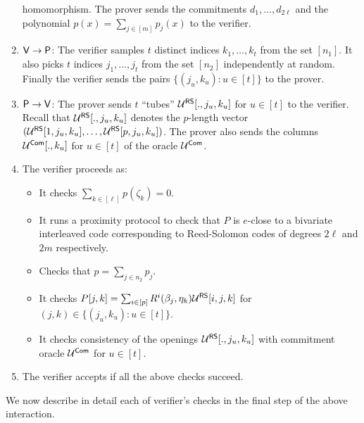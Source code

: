 \begin{enumerate}[{\rm 1.}]
homomorphism.
The prover sends the commitments $d_1,\ldots,d_{2\ell}$ and the polynomial
$p(x)=\sum_{j\in[m]} p_j(x)$ to the verifier.
\item $\mathsf{V}\rightarrow\mathsf{P}$: The verifier samples $t$ distinct indices
$k_1,\ldots,k_t$ from the set $[n_1]$. It also picks $t$ indices
$j_1,\ldots,j_t$ from the set $[n_2]$ independently at random. Finally the
verifier sends the pairs $\{(j_u,k_u):u\in [t]\}$ to the prover.
\item $\mathsf{P}\rightarrow\mathsf{V}$: The prover sends $t$ ``tubes''
$\mathcal{U}^{\mathsf{RS}}[.,j_u,k_u]$ for $u\in [t]$ to the verifier. Recall that
$\mathcal{U}^{\mathsf{RS}}[.,j_u,k_u]$ denotes the $p$-length vector
$(\mathcal{U}^{\mathsf{RS}}[1,j_u,k_u],\ldots,\mathcal{U}^{\mathsf{RS}}[p,j_u,k_u])$. The prover also sends the
columns $\mathcal{U}^{\mathsf{Com}}[.,k_u]$ for $u\in [t]$ of the oracle $\mathcal{U}^{\mathsf{Com}}$. 
\item The verifier proceeds as:
\begin{itemize}
\item It checks $\sum_{k\in [\ell]}p(\zeta_k)=0$.
\item It runs a proximity protocol to check that $P$ is $e$-close to
a bivariate interleaved code corresponding to Reed-Solomon codes of degrees
$2\ell$ and $2m$ respectively.
\item Checks that $p=\sum_{j\in n_2}p_j$.
\item It checks $P[j,k]=\sum_{i\in [p]}R^i(\beta_j,\eta_k)\mathcal{U}^{\mathsf{RS}}[i,j,k]$ for
$(j,k)\in \{(j_u,k_u):u\in [t]\}$.
\item It checks consistency of the openings $\mathcal{U}^{\mathsf{RS}}[.,j_u,k_u]$ with
commitment oracle $\mathcal{U}^{\mathsf{Com}}$ for $u\in [t]$. 
\end{itemize}
\item The verifier accepts if all the above checks succeed.
\end{enumerate}
We now describe in detail each of verifier's checks in the final step of the
above interaction.\smallskip

